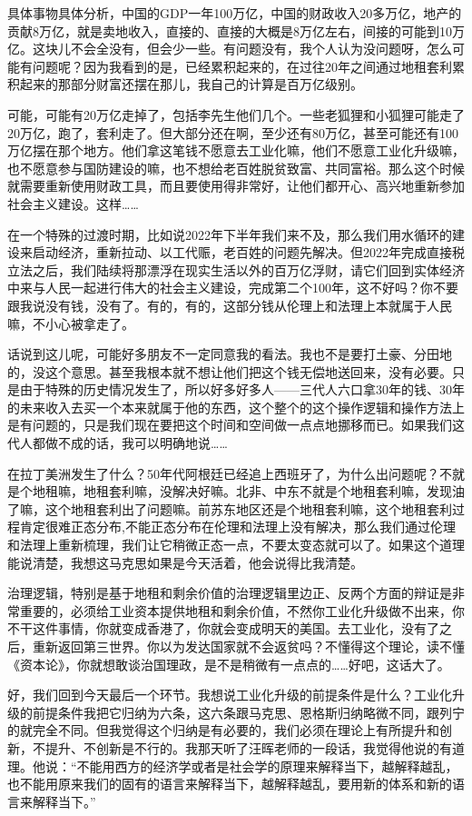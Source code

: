 \documentclass[UTF8, 12pt, a4paper]{ctexrep}
\begin{document}
具体事物具体分析，中国的GDP一年100万亿，中国的财政收入20多万亿，地产的贡献8万亿，就是卖地收入，直接的、直接的大概是8万亿左右，间接的可能到10万亿。这块儿不会全没有，但会少一些。有问题没有，我个人认为没问题呀，怎么可能有问题呢？因为我看到的是，已经累积起来的，在过往20年之间通过地租套利累积起来的那部分财富还摆在那儿，我自己的计算是百万亿级别。

可能，可能有20万亿走掉了，包括李先生他们几个。一些老狐狸和小狐狸可能走了20万亿，跑了，套利走了。但大部分还在啊，至少还有80万亿，甚至可能还有100万亿摆在那个地方。他们拿这笔钱不愿意去工业化嘛，他们不愿意工业化升级嘛，也不愿意参与国防建设的嘛，也不想给老百姓脱贫致富、共同富裕。那么这个时候就需要重新使用财政工具，而且要使用得非常好，让他们都开心、高兴地重新参加社会主义建设。这样……

在一个特殊的过渡时期，比如说2022年下半年我们来不及，那么我们用水循环的建设来启动经济，重新拉动、以工代赈，老百姓的问题先解决。但2022年完成直接税立法之后，我们陆续将那漂浮在现实生活以外的百万亿浮财，请它们回到实体经济中来与人民一起进行伟大的社会主义建设，完成第二个100年，这不好吗？你不要跟我说没有钱，没有了。有的，有的，这部分钱从伦理上和法理上本就属于人民嘛，不小心被拿走了。

话说到这儿呢，可能好多朋友不一定同意我的看法。我也不是要打土豪、分田地的，没这个意思。甚至我根本就不想让他们把这个钱无偿地送回来，没有必要。只是由于特殊的历史情况发生了，所以好多好多人——三代人六口拿30年的钱、30年的未来收入去买一个本来就属于他的东西，这个整个的这个操作逻辑和操作方法上是有问题的，只是我们现在要把这个时间和空间做一点点地挪移而已。如果我们这代人都做不成的话，我可以明确地说……

在拉丁美洲发生了什么？50年代阿根廷已经追上西班牙了，为什么出问题呢？不就是个地租嘛，地租套利嘛，没解决好嘛。北非、中东不就是个地租套利嘛，发现油了嘛，这个地租套利出了问题嘛。前苏东地区还是个地租套利嘛，这个地租套利过程肯定很难正态分布,不能正态分布在伦理和法理上没有解决，那么我们通过伦理和法理上重新梳理，我们让它稍微正态一点，不要太变态就可以了。如果这个道理能说清楚，我想这马克思如果是今天活着，他会说得比我清楚。

治理逻辑，特别是基于地租和剩余价值的治理逻辑里边正、反两个方面的辩证是非常重要的，必须给工业资本提供地租和剩余价值，不然你工业化升级做不出来，你不干这件事情，你就变成香港了，你就会变成明天的美国。去工业化，没有了之后，重新返回第三世界。你以为发达国家就不会返贫吗？不懂得这个理论，读不懂《资本论》，你就想敢谈治国理政，是不是稍微有一点点的……好吧，这话大了。

好，我们回到今天最后一个环节。我想说工业化升级的前提条件是什么？工业化升级的前提条件我把它归纳为六条，这六条跟马克思、恩格斯归纳略微不同，跟列宁的就完全不同。但我觉得这个归纳是有必要的，我们必须在理论上有所提升和创新，不提升、不创新是不行的。我那天听了汪晖老师的一段话，我觉得他说的有道理。他说：“不能用西方的经济学或者是社会学的原理来解释当下，越解释越乱，也不能用原来我们的固有的语言来解释当下，越解释越乱，要用新的体系和新的语言来解释当下。”
\end{document}
